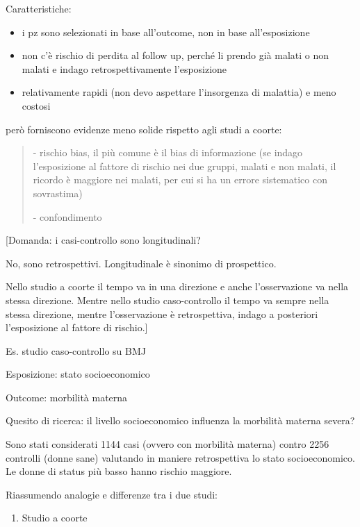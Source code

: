 Caratteristiche:

\begin{itemize}
\item
  i pz sono selezionati in base all'outcome, non in base all'esposizione
\item
  non c'è rischio di perdita al follow up, perché li prendo già malati o
  non malati e indago retrospettivamente l'esposizione
\item
  relativamente rapidi (non devo aspettare l'insorgenza di malattia) e
  meno costosi
\end{itemize}

però forniscono evidenze meno solide rispetto agli studi a coorte:

\begin{quote}
- rischio bias, il più comune è il bias di informazione (se indago
l'esposizione al fattore di rischio nei due gruppi, malati e non malati,
il ricordo è maggiore nei malati, per cui si ha un errore sistematico
con sovrastima)

- confondimento
\end{quote}

{[}Domanda: i casi-controllo sono longitudinali?

No, sono retrospettivi. Longitudinale è sinonimo di prospettico.

Nello studio a coorte il tempo va in una direzione e anche
l'osservazione va nella stessa direzione. Mentre nello studio
caso-controllo il tempo va sempre nella stessa direzione, mentre
l'osservazione è retrospettiva, indago a posteriori l'esposizione al
fattore di rischio.{]}

Es. studio caso-controllo su BMJ

Esposizione: stato socioeconomico

Outcome: morbilità materna

Quesito di ricerca: il livello socioeconomico influenza la morbilità
materna severa?

Sono stati considerati 1144 casi (ovvero con morbilità materna) contro
2256 controlli (donne sane) valutando in maniere retrospettiva lo stato
socioeconomico. Le donne di status più basso hanno rischio maggiore.

Riassumendo analogie e differenze tra i due studi:

\begin{enumerate}
\def\labelenumi{\arabic{enumi}.}
\item
  Studio a coorte
\end{enumerate}

